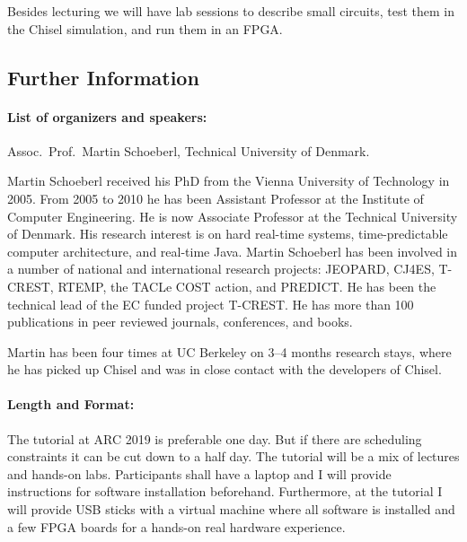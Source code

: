 \documentclass{article}
\begin{document}

Besides lecturing we will have lab sessions to describe small circuits, test them in the Chisel simulation,
and run them in an FPGA.


\subsection*{Further Information}

\paragraph{List of organizers and speakers:}
Assoc.~Prof.~Martin Schoeberl, Technical University of Denmark.

Martin Schoeberl received his PhD from the Vienna University of Technology in 2005. From 2005 to 2010 he has been Assistant Professor at the Institute of Computer Engineering. He is now Associate Professor at the Technical University of Denmark. His research interest is on hard real-time systems, time-predictable computer architecture, and real-time Java.  Martin Schoeberl has been involved in a number of national and international research projects: JEOPARD, CJ4ES, T-CREST, RTEMP, the TACLe COST action, and PREDICT.  He has been the technical lead of the EC funded project T-CREST.  He has more than 100 publications in peer reviewed journals, conferences, and books.

Martin has been four times at UC Berkeley on 3--4 months research stays, where he has picked up Chisel
and was in close contact with the developers of Chisel.


\paragraph{Length and Format:} The tutorial at ARC 2019 is preferable one day. But if there are scheduling
constraints it can be cut down to a half day.
The tutorial will be a mix of lectures and hands-on labs. Participants shall have a laptop and I will provide
instructions for software installation beforehand. Furthermore, at the tutorial I will provide USB sticks
with a virtual machine where all software is installed and a few FPGA boards for a hands-on real
hardware experience.
\end{document}
